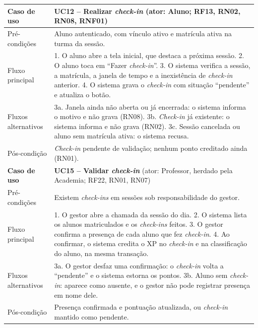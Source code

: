 \begin{quadro}[!htb]
  \caption{Descrição dos casos de uso UC12 e UC15}
  \label{qua:uc12-uc15}
  \centering
  \footnotesize
  \begin{tabular}{|p{2.7cm}|p{10.6cm}|}
    \hline
    \textbf{Caso de uso} & \textbf{UC12 -- Realizar \textit{check-in}} (ator: Aluno; RF13, RN02, RN08, RNF01) \\ \hline
    Pré-condições & Aluno autenticado, com vínculo ativo e matrícula ativa na turma da sessão. \\ \hline
    Fluxo principal & 1. O aluno abre a tela inicial, que destaca a próxima sessão. 2. O aluno toca em ``Fazer \textit{check-in}''. 3. O sistema verifica a sessão, a matrícula, a janela de tempo e a inexistência de \textit{check-in} anterior. 4. O sistema grava o \textit{check-in} com situação ``pendente'' e atualiza o botão. \\ \hline
    Fluxos alternativos & 3a. Janela ainda não aberta ou já encerrada: o sistema informa o motivo e não grava (RN08). 3b. \textit{Check-in} já existente: o sistema informa e não grava (RN02). 3c. Sessão cancelada ou aluno sem matrícula ativa: o sistema recusa. \\ \hline
    Pós-condição & \textit{Check-in} pendente de validação; nenhum ponto creditado ainda (RN01). \\ \hline\hline
    \textbf{Caso de uso} & \textbf{UC15 -- Validar \textit{check-in}} (ator: Professor, herdado pela Academia; RF22, RN01, RN07) \\ \hline
    Pré-condições & Existem \textit{check-ins} em sessões sob responsabilidade do gestor. \\ \hline
    Fluxo principal & 1. O gestor abre a chamada da sessão do dia. 2. O sistema lista os alunos matriculados e os \textit{check-ins} feitos. 3. O gestor confirma a presença de cada aluno que fez \textit{check-in}. 4. Ao confirmar, o sistema credita o XP no \textit{check-in} e na classificação do aluno, na mesma transação. \\ \hline
    Fluxos alternativos & 3a. O gestor desfaz uma confirmação: o \textit{check-in} volta a ``pendente'' e o sistema estorna os pontos. 3b. Aluno sem \textit{check-in}: aparece como ausente, e o gestor não pode registrar presença em nome dele. \\ \hline
    Pós-condição & Presença confirmada e pontuação atualizada, ou \textit{check-in} mantido como pendente. \\ \hline
  \end{tabular}
\end{quadro}

